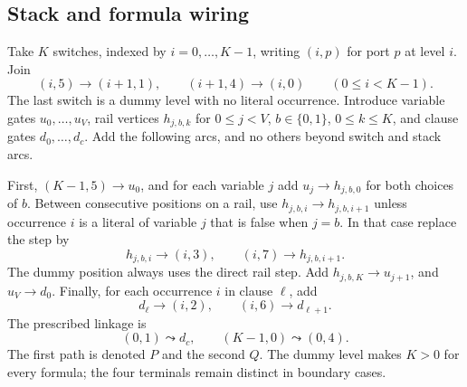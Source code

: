 \documentclass[11pt,a4paper]{article}
\begin{document}
\subsection{Stack and formula wiring}
Take $K$ switches, indexed by $i=0,\ldots,K-1$, writing $(i,p)$ for port
$p$ at level $i$. Join
\begin{equation}\label{eq:stack}
 (i,5)\longrightarrow(i+1,1),\qquad
 (i+1,4)\longrightarrow(i,0)\qquad(0\leq i<K-1).
\end{equation}
The last switch is a dummy level with no literal occurrence. Introduce
variable gates $u_0,\ldots,u_V$, rail vertices $h_{j,b,k}$ for
$0\leq j<V$, $b\in\{0,1\}$, $0\leq k\leq K$, and clause gates
$d_0,\ldots,d_c$. Add the following arcs, and no others beyond switch
and stack arcs.

First, $(K-1,5)\to u_0$, and for each variable $j$ add
$u_j\to h_{j,b,0}$ for both choices of $b$. Between consecutive positions
on a rail, use $h_{j,b,i}\to h_{j,b,i+1}$ unless occurrence $i$ is a literal
of variable $j$ that is false when $j=b$. In that case replace the step by
\begin{equation}\label{eq:rail}
 h_{j,b,i}\longrightarrow(i,3),\qquad
 (i,7)\longrightarrow h_{j,b,i+1}.
\end{equation}
The dummy position always uses the direct rail step. Add
$h_{j,b,K}\to u_{j+1}$, and $u_V\to d_0$. Finally, for each occurrence $i$
in clause $\ell$, add
\begin{equation}\label{eq:clause}
 d_\ell\longrightarrow(i,2),\qquad
 (i,6)\longrightarrow d_{\ell+1}.
\end{equation}
The prescribed linkage is
\begin{equation}\label{eq:terminals}
 (0,1)\leadsto d_c,
 \qquad (K-1,0)\leadsto(0,4).
\end{equation}
The first path is denoted $P$ and the second $Q$. The dummy level makes
$K>0$ for every formula; the four terminals remain distinct in boundary cases.
\end{document}
